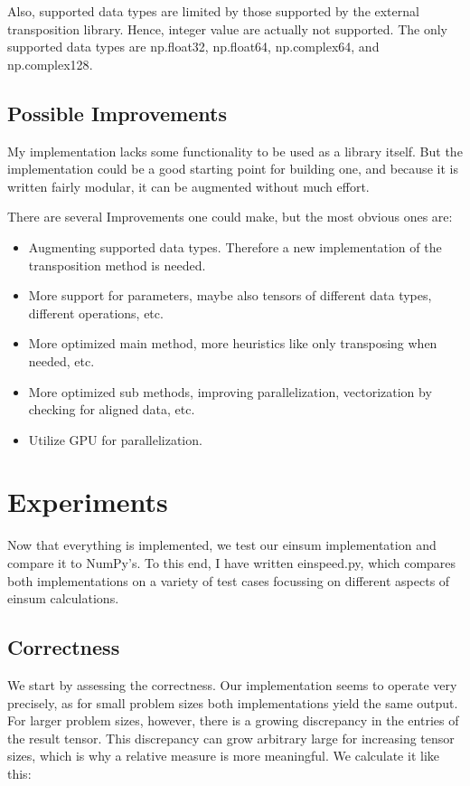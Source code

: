 \documentclass[sigconf]{acmart}
\renewcommand{\texttt}[1]{\begingroup\ttfamily\sloppy\hbadness=10000 #1\endgroup}
\begin{document}
Also, supported data types are limited by those supported by the external transposition library. Hence, integer value are actually not supported. The only supported data types are \texttt{np.float32}, \texttt{np.float64}, \texttt{np.complex64}, and \texttt{np.complex128}.


\subsection{Possible Improvements}
My implementation lacks some functionality to be used as a library itself. But the implementation could be a good starting point for building one, and because it is written fairly modular, it can be augmented without much effort.

There are several Improvements one could make, but the most obvious ones are:
\begin{itemize}
  \item Augmenting supported data types. Therefore a new implementation of the transposition method is needed.
  \item More support for parameters, maybe also tensors of different data types, different operations, etc.
  \item More optimized main method, more heuristics like only transposing when needed, etc.
  \item More optimized sub methods, improving parallelization, vectorization by checking for aligned data, etc.
  \item Utilize GPU for parallelization.
\end{itemize}



\section{Experiments}
\label{sec:experiments}

Now that everything is implemented, we test our einsum implementation and compare it to NumPy's. To this end, I have written \texttt{einspeed.py}, which compares both implementations on a variety of test cases focussing on different aspects of einsum calculations.

\subsection{Correctness}
We start by assessing the correctness. Our implementation seems to operate very precisely, as for small problem sizes both implementations yield the same output. For larger problem sizes, however, there is a growing discrepancy in the entries of the result tensor. This discrepancy can grow arbitrary large for increasing tensor sizes, which is why a relative measure is more meaningful. We calculate it like this:
\end{document}
